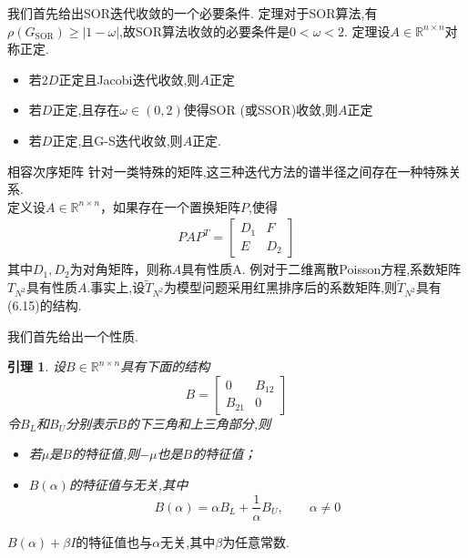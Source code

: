 \documentclass[notheorems,serif]{beamer}
\newcommand{\hei}[1]{{\HEI#1}}
\newtheorem{lemma}{\hei{引理}}
\begin{document}
\begin{frame}
我们首先给出SOR迭代收敛的一个必要条件.
{\color{blue}定理}对于SOR算法,有$\rho\left(G_{\mathrm{SOR}}\right) \geq|1-\omega|$,故SOR算法收敛的必要条件是$0<\omega<2$.
{\color{blue}定理}\quad 设$A \in \mathbb{R}^{n \times n}$对称正定.
\begin{itemize}
\item[(1)]若$2D$正定且Jacobi迭代收敛,则$A$正定

\item[(2)]若$D$正定,且存在$\omega \in(0,2)$使得SOR (或SSOR)收敛,则$A$正定

\item[(3)]若$D$正定,且G-S迭代收敛,则$A$正定.
\end{itemize}
\end{frame}


\begin{frame}{相容次序矩阵}
针对一类特殊的矩阵,这三种迭代方法的谱半径之间存在一种特殊关系.\\
{\color{blue}定义}设$A \in \mathbb{R}^{n \times n}$，如果存在一个置换矩阵$P$,使得
\begin{align}
P A P^{T}=\left[\begin{array}{cc}{D_{1}} & {F} \\ {E} & {D_{2}}\end{array}\right]\tag{6.15}
\end{align}
其中$D_{1}, D_{2}$为对角矩阵，则称$A$具有{\color{blue}性质A}.
{\color{blue}例}\quad 对于二维离散Poisson方程,系数矩阵$T_{N^{2}}$具有性质$A$.事实上,设$\tilde{T}_{N^{2}}$为模型问题采用红黑排序后的系数矩阵,则$\tilde{T}_{N^{2}}$具有({\color{blue}6.15})的结构.\\
\end{frame}

\begin{frame}
我们首先给出一个性质.\\
\begin{lemma}
\quad 设$B \in \mathbb{R}^{n \times n}$具有下面的结构
$$
B=\left[\begin{array}{cc}{0} & {B_{12}} \\ {B_{21}} & {0}\end{array}\right]
$$
令$B_L$和$B_U$分别表示$B$的下三角和上三角部分,则
\begin{itemize}
\item[(1)]若$\mu$是$B$的特征值,则$-\mu$也是$B$的特征值；

\item[(2)]$B(\alpha)$的特征值与无关,其中
$$
B(\alpha)=\alpha B_L+\frac{1}{\alpha}B_U,\qquad \alpha \ne 0
$$
\end{itemize}
\end{lemma}

$B(\alpha)+\beta I$的特征值也与$\alpha$无关,其中$\beta$为任意常数.
\end{frame}
\end{document}
